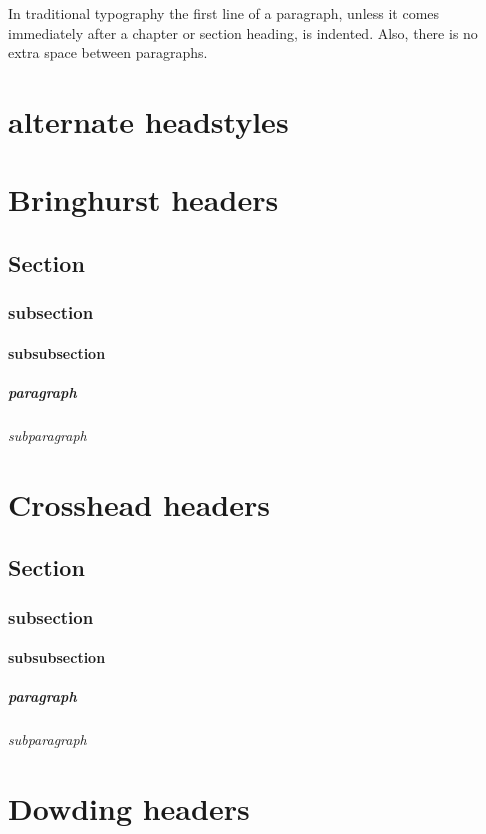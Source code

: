 \documentclass[a4paper, 12pt]{memoir}
\begin{document}
In traditional typography the first line of a paragraph, unless it comes immediately after a
chapter or section heading, is indented. Also, there is no extra space between paragraphs.

\chapter*{ alternate headstyles }
 
\chapter*{ Bringhurst headers } 
\section*{Section}
\subsection*{subsection }
\subsubsection*{subsubsection} 
\paragraph*{paragraph} 
\subparagraph*{subparagraph} 

\chapter*{ Crosshead headers } 
\section*{ Section }
\subsection*{subsection }
\subsubsection*{subsubsection} 
\paragraph*{paragraph} 
\subparagraph*{subparagraph} 

\chapter*{ Dowding headers } 
\end{document}
